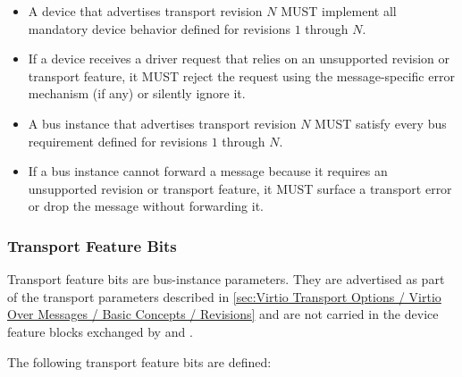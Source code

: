 \begin{itemize}
  \item A device that advertises transport revision $N$ MUST implement all
        mandatory device behavior defined for revisions $1$ through $N$.
  \item If a device receives a driver request that relies on an unsupported
        revision or transport feature, it MUST reject the request using the
        message-specific error mechanism (if any) or silently ignore it.
\end{itemize}

\begin{itemize}
  \item A bus instance that advertises transport revision $N$ MUST satisfy every
        bus requirement defined for revisions $1$ through $N$.
  \item If a bus instance cannot forward a message because it requires an
        unsupported revision or transport feature, it MUST surface a transport
        error or drop the message without forwarding it.
\end{itemize}

\subsubsection{Transport Feature Bits}
\label{sec:Virtio Transport Options / Virtio Over Messages / Basic Concepts / Transport Feature Bits}

Transport feature bits are bus-instance parameters. They are advertised as part
of the transport parameters described in
\ref{sec:Virtio Transport Options / Virtio Over Messages / Basic Concepts / Revisions}
and are not carried in the device feature blocks exchanged by
 and .

The following transport feature bits are defined:

